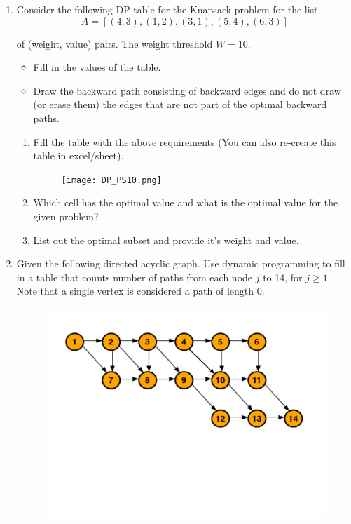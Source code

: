 \documentclass[12pt]{article}
\begin{document}
\begin{enumerate}

\item \label{2} Consider the following DP table for the Knapsack problem for the list
\[
A = [(4, 3), (1, 2), (3, 1), (5, 4), (6, 3)]
\]

\noindent of (weight, value) pairs. The weight threshold $W = 10$.
\begin{itemize}
    \item Fill in the values of the table.
    \item Draw the backward path consisting of backward edges and do not draw (or erase them) the edges that are not part of the optimal backward paths.
\end{itemize}

\begin{enumerate}
    \item Fill the table with the above requirements (You can also re-create this table in excel/sheet).


\begin{figure}[h!]
\begin{center}
\texttt{[image: DP\_PS10.png]}
\end{center}
\end{figure}
    \item Which cell has the optimal value and what is the optimal value for the given problem? \vskip 60pt
    
    \item List out the optimal subset and provide it's weight and value.
\end{enumerate}



\newpage 
\item Given the following directed acyclic graph. Use dynamic programming to fill in a table that counts number of paths from each node $j$ to 14, for $j \geq 1$. Note that a single vertex is considered a path of length $0$.

        \begin{figure}[h!]
        \begin{center}
        \includegraphics[scale=0.45]{dag_ps10.pdf} 
        \end{center}
        \end{figure}
\end{enumerate}
\end{document}
